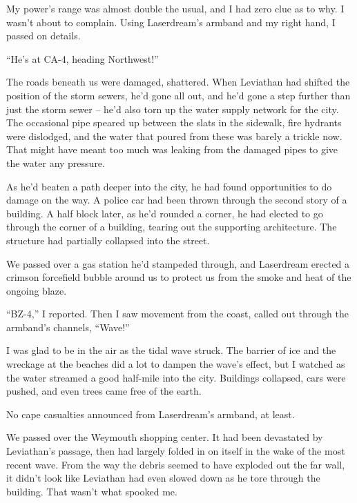 My power's range was almost double the usual, and I had zero clue as to why.  I wasn't about to complain.  Using Laserdream's armband and my right hand, I passed on details.



``He's at CA-4, heading Northwest!''



The roads beneath us were damaged, shattered.  When Leviathan had shifted the position of the storm sewers, he'd gone all out, and he'd gone a step further than just the storm sewer – he'd also torn up the water supply network for the city.  The occasional pipe speared up between the slats in the sidewalk, fire hydrants were dislodged, and the water that poured from these was barely a trickle now.  That might have meant too much was leaking from the damaged pipes to give the water any pressure.



As he'd beaten a path deeper into the city, he had found opportunities to do damage on the way.  A police car had been thrown through the second story of a building.  A half block later, as he'd rounded a corner, he had elected to go through the corner of a building, tearing out the supporting architecture.  The structure had partially collapsed into the street.



We passed over a gas station he'd stampeded through, and Laserdream erected a crimson forcefield bubble around us to protect us from the smoke and heat of the ongoing blaze.



``BZ-4,'' I reported.  Then I saw movement from the coast, called out through the armband's channels, ``Wave!''



I was glad to be in the air as the tidal wave struck.  The barrier of ice and the wreckage at the beaches did a lot to dampen the wave's effect, but I watched as the water streamed a good half-mile into the city.  Buildings collapsed, cars were pushed, and even trees came free of the earth.



No cape casualties announced from Laserdream's armband, at least.



We passed over the Weymouth shopping center.  It had been devastated by Leviathan's passage, then had largely folded in on itself in the wake of the most recent wave.  From the way the debris seemed to have exploded out the far wall, it didn't look like Leviathan had even slowed down as he tore through the building.  That wasn't what spooked me.



